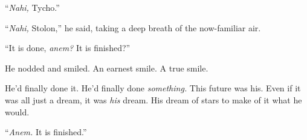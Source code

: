 ``\emph{Nahi,} Tycho.''

``\emph{Nahi,} Stolon,'' he said, taking a deep breath of the now-familiar air.

``It is done, \emph{anem?} It is finished?''

He nodded and smiled. An earnest smile. A true smile.

He'd finally done it. He'd finally done \emph{something.} This future was his. Even if it was all just a dream, it was \emph{his} dream. His dream of stars to make of it what he would.

``\emph{Anem.} It is finished.''
